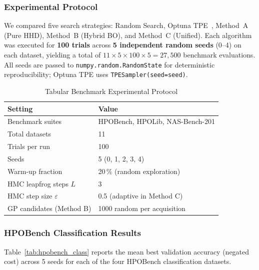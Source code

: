 \documentclass[11pt]{article}
\begin{document}
\subsubsection{Experimental Protocol}

We compared five search strategies: Random Search, Optuna
TPE~\cite{akiba2019optuna,bergstra2011tpe}, Method~A (Pure HHD),
Method~B (Hybrid BO), and Method~C (Unified).  Each algorithm was
executed for \textbf{100 trials} across \textbf{5 independent random
seeds} (0--4) on each dataset, yielding a total of
$11 \times 5 \times 100 \times 5 = 27{,}500$ benchmark evaluations.
All seeds are passed to \texttt{numpy.random.RandomState} for
deterministic reproducibility; Optuna TPE uses
\texttt{TPESampler(seed=seed)}.

\begin{table}[H]
\centering
\caption{Tabular Benchmark Experimental Protocol}
\label{tab:tabular_protocol}
\renewcommand{\arraystretch}{1.2}
\begin{tabular}{ll}
\toprule
Setting & Value \\
\midrule
Benchmark suites     & HPOBench, HPOLib, NAS-Bench-201 \\
Total datasets       & 11 \\
Trials per run       & 100 \\
Seeds                & 5 (0, 1, 2, 3, 4) \\
Warm-up fraction     & 20\,\% (random exploration) \\
HMC leapfrog steps $L$ & 3 \\
HMC step size $\varepsilon$ & 0.5 (adaptive in Method C) \\
GP candidates (Method B) & 1000 random per acquisition \\
\bottomrule
\end{tabular}
\end{table}

\subsubsection{HPOBench Classification Results}

Table~\ref{tab:hpobench_class} reports the mean best validation accuracy
(negated cost) across 5 seeds for each of the four HPOBench classification
datasets.
\end{document}
